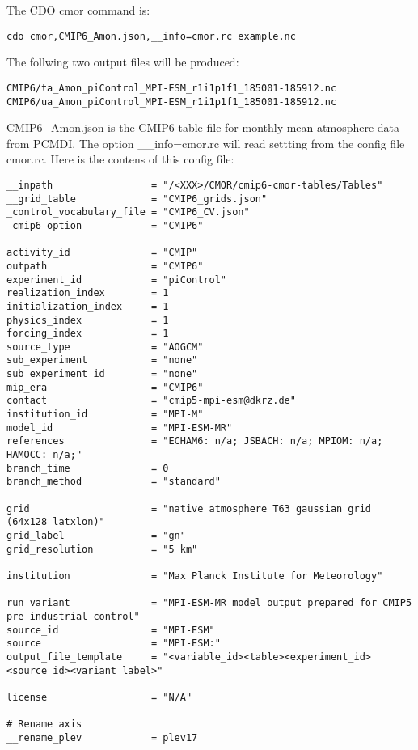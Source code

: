 The CDO cmor command is:
\begin{lstlisting}[frame=single, backgroundcolor=\color{pcolor1}, basicstyle=\footnotesize]
   cdo cmor,CMIP6_Amon.json,__info=cmor.rc example.nc
\end{lstlisting}
The follwing two output files will be produced:
\begin{lstlisting}[frame=single, backgroundcolor=\color{pcolor1}, basicstyle=\footnotesize]
CMIP6/ta_Amon_piControl_MPI-ESM_r1i1p1f1_185001-185912.nc
CMIP6/ua_Amon_piControl_MPI-ESM_r1i1p1f1_185001-185912.nc
\end{lstlisting}
CMIP6\_Amon.json is the CMIP6 table file for monthly mean atmosphere
data from PCMDI. The option \_\_info=cmor.rc will read settting from
the config file cmor.rc.
Here is the contens of this config file:
\begin{lstlisting}[frame=single, backgroundcolor=\color{pcolor1},  basicstyle=\footnotesize]
__inpath                 = "/<XXX>/CMOR/cmip6-cmor-tables/Tables"
__grid_table             = "CMIP6_grids.json"
_control_vocabulary_file = "CMIP6_CV.json"
_cmip6_option            = "CMIP6"

activity_id              = "CMIP"
outpath                  = "CMIP6"
experiment_id            = "piControl"
realization_index        = 1
initialization_index     = 1
physics_index            = 1
forcing_index            = 1
source_type              = "AOGCM"
sub_experiment           = "none"
sub_experiment_id        = "none"
mip_era                  = "CMIP6"
contact                  = "cmip5-mpi-esm@dkrz.de"
institution_id           = "MPI-M"
model_id                 = "MPI-ESM-MR"
references               = "ECHAM6: n/a; JSBACH: n/a; MPIOM: n/a;  HAMOCC: n/a;"
branch_time              = 0
branch_method            = "standard"

grid                     = "native atmosphere T63 gaussian grid (64x128 latxlon)"
grid_label               = "gn"
grid_resolution          = "5 km"

institution              = "Max Planck Institute for Meteorology"

run_variant              = "MPI-ESM-MR model output prepared for CMIP5 pre-industrial control"
source_id                = "MPI-ESM"
source                   = "MPI-ESM:"
output_file_template     = "<variable_id><table><experiment_id><source_id><variant_label>"

license                  = "N/A"

# Rename axis
__rename_plev            = plev17
\end{lstlisting}

